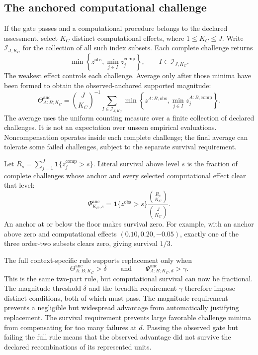 \documentclass[11pt]{article}
\newcommand{\Psianc}{\Psi^{\mathrm{anc}}}
\newcommand{\Thetaanc}{\Theta^{\mathrm{anc}}}
\theoremstyle{remark}
\begin{document}
\subsection{The anchored computational challenge}

If the gate passes and a computational procedure belongs to the declared
assessment, select $K_C$ distinct computational effects, where $1\leq K_C\leq J$.
Write $\mathcal I_{J,K_C}$ for the collection of all such index subsets. Each
complete challenge returns
\[
\min\left\{z^{\mathrm{obs}},\min_{j\in I}z_j^{\mathrm{comp}}\right\},
\qquad I\in\mathcal I_{J,K_C}.
\]
The weakest effect controls each challenge. Average only after those minima
have been formed to obtain the observed-anchored supported magnitude:
\begin{equation}
\Thetaanc_{A:B;K_C}
=\binom{J}{K_C}^{-1}
\sum_{I\in\mathcal I_{J,K_C}}
\min\left\{z^{A:B,\mathrm{obs}},
\min_{j\in I}z_j^{A:B,\mathrm{comp}}\right\}.
\label{eq:context-supported-magnitude}
\end{equation}
The average uses the uniform counting
measure over a finite collection of declared challenges. It is not an
expectation over unseen empirical evaluations. Noncompensation operates
inside each complete challenge; the final average can tolerate some failed
challenges, subject to the separate survival requirement.

Let $R_s=\sum_{j=1}^J\mathbf1\{z_j^{\mathrm{comp}}>s\}$. Literal survival
above level $s$ is the fraction of complete challenges whose anchor and every
selected computational effect clear that level:
\begin{equation}
\Psianc_{K_C,s}
=\mathbf1\{z^{\mathrm{obs}}>s\}
\frac{\binom{R_s}{K_C}}{\binom{J}{K_C}}.
\label{eq:context-literal-survival}
\end{equation}
An anchor at or below the floor makes survival zero. For example, with an
anchor above zero and computational effects $(0.10,0.20,-0.05)$, exactly one
of the three order-two subsets clears zero, giving survival $1/3$.

The full context-specific rule supports replacement only when
\begin{equation}
\Thetaanc_{A:B;K_C}>\delta
\qquad\text{and}\qquad
\Psianc_{A:B;K_C,d}>\gamma.
\label{eq:context-full-rule}
\end{equation}
This is the same two-part rule, but computational survival can now be
fractional. The magnitude threshold $\delta$ and the breadth requirement
$\gamma$ therefore impose distinct conditions, both of which must pass.
The magnitude requirement prevents a negligible but widespread advantage from
automatically justifying replacement. The survival requirement prevents large
favorable challenge minima from compensating for too many failures at $d$.
Passing the observed gate but failing the full rule means that the observed
advantage did not survive the declared recombinations of its represented units.
\end{document}
